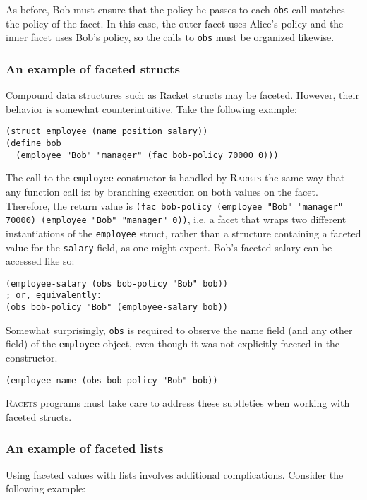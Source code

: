 \documentclass{article}
\begin{document}
As before, Bob must ensure that the policy he passes to each \texttt{obs} call matches the policy of the facet. In this case, the outer facet uses Alice's policy and the inner facet uses Bob's policy, so the calls to \texttt{obs} must be organized likewise.


\subsubsection{An example of faceted structs}
Compound data structures such as Racket structs may be faceted. However, their behavior is somewhat counterintuitive. Take the following example:

\begin{lstlisting}
(struct employee (name position salary))
(define bob
  (employee "Bob" "manager" (fac bob-policy 70000 0)))
\end{lstlisting}

The call to the \texttt{employee} constructor is handled by \textsc{Racets} the same way that any function call is: by branching execution on both values on the facet. Therefore, the return value is \texttt{(fac bob-policy (employee "Bob" "manager" 70000) (employee "Bob" "manager" 0))}, i.e. a facet that wraps two different instantiations of the \texttt{employee} struct, rather than a structure containing a faceted value for the \texttt{salary} field, as one might expect. Bob's faceted salary can be accessed like so:

\begin{lstlisting}
(employee-salary (obs bob-policy "Bob" bob))
; or, equivalently:
(obs bob-policy "Bob" (employee-salary bob))
\end{lstlisting}

Somewhat surprisingly, \texttt{obs} is required to observe the name field (and any other field) of the \texttt{employee} object, even though it was not explicitly faceted in the constructor.

\begin{lstlisting}
(employee-name (obs bob-policy "Bob" bob))
\end{lstlisting}

\textsc{Racets} programs must take care to address these subtleties when working with faceted structs.


\subsubsection{An example of faceted lists}
Using faceted values with lists involves additional complications. Consider the following example:
\end{document}
